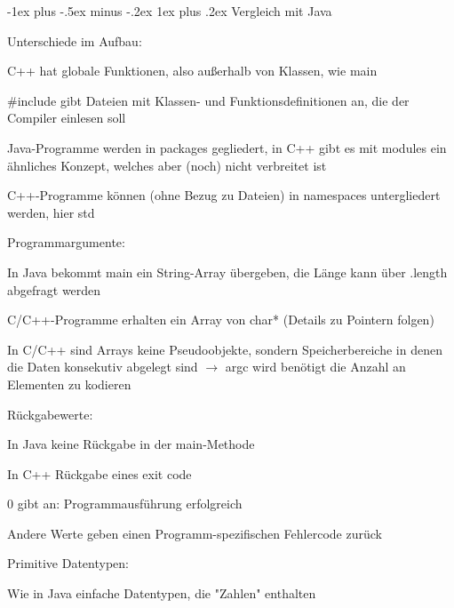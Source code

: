 \documentclass[10pt]{article}
\makeatletter
\renewcommand{\subsubsection}{\@startsection{subsubsection}{3}{0mm}%
                                {-1ex plus -.5ex minus -.2ex}%
                                {1ex plus .2ex}%
                                {\normalfont\small\bfseries}}
\makeatother
\begin{document}
\subsubsection{Vergleich mit Java}
\begin{itemize*}
  \item Unterschiede im Aufbau:
  \begin{itemize*}
    \item C++ hat globale Funktionen, also außerhalb von Klassen, wie main
    \item \#include gibt Dateien mit Klassen- und Funktionsdefinitionen an, die der Compiler einlesen soll
    \item Java-Programme werden in packages gegliedert, in C++ gibt es mit modules ein ähnliches Konzept, welches aber (noch) nicht verbreitet ist
    \item C++-Programme können (ohne Bezug zu Dateien) in namespaces untergliedert werden, hier std
  \end{itemize*}
  \item Programmargumente:
  \begin{itemize*}
    \item In Java bekommt main ein String-Array übergeben, die Länge kann über .length abgefragt werden
    \item C/C++-Programme erhalten ein Array von char* (Details zu Pointern folgen)
    \item In C/C++ sind Arrays keine Pseudoobjekte, sondern Speicherbereiche in denen die Daten konsekutiv abgelegt sind $\rightarrow$ argc wird benötigt die Anzahl an Elementen zu kodieren
  \end{itemize*}
  \item Rückgabewerte:
  \begin{itemize*}
    \item In Java keine Rückgabe in der main-Methode
    \item In C++ Rückgabe eines exit code
    \begin{itemize*}
      \item 0 gibt an: Programmausführung erfolgreich
      \item Andere Werte geben einen Programm-spezifischen Fehlercode zurück
    \end{itemize*}
  \end{itemize*}
  \item Primitive Datentypen:
  \begin{itemize*}
    \item Wie in Java einfache Datentypen, die "Zahlen" enthalten

\end{itemize*}
\end{itemize*}
\end{document}
